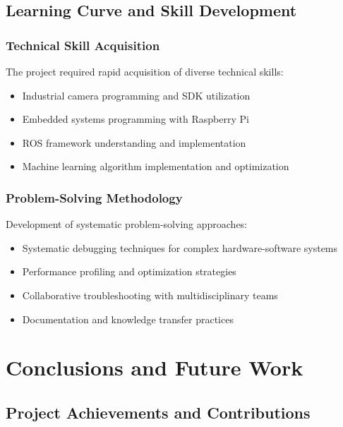 \documentclass{book}
\begin{document}
\section{Learning Curve and Skill Development}

\subsection{Technical Skill Acquisition}

\par\noindent The project required rapid acquisition of diverse technical skills:

\begin{itemize}
\item Industrial camera programming and SDK utilization
\item Embedded systems programming with Raspberry Pi
\item ROS framework understanding and implementation
\item Machine learning algorithm implementation and optimization
\end{itemize}

\subsection{Problem-Solving Methodology}

\par\noindent Development of systematic problem-solving approaches:

\begin{itemize}
\item Systematic debugging techniques for complex hardware-software systems
\item Performance profiling and optimization strategies
\item Collaborative troubleshooting with multidisciplinary teams
\item Documentation and knowledge transfer practices
\end{itemize}

\chapter{Conclusions and Future Work}

\section{Project Achievements and Contributions}
\end{document}
